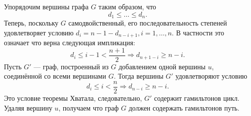 \documentclass[a4paper,12pt,twoside]{article}
\begin{document}
\begin{solution}{}
    Упорядочим вершины графа \(G\) таким образом, что
    \[
        d_{1} \leq \ldots \leq d_{n}.
    \]
    Теперь, поскольку \(G\) самодвойственный, его последовательность степеней удовлетворяет условию \(d_{i} = n - 1 - d_{n-i + 1}, i = 1, \ldots, n\). В частности это означает что верна следующая импликация:
    \[
        d_{i} \leq i - 1 < \frac{n + 1}{2} \Rightarrow d_{n + 1 - i} \geq n - i.
    \]
    Пусть \(G'\) --- граф, построенный из \(G\) добавлением одной вершины \(u\), соединённой со всеми вершинами \(G\). Тогда вершины \(G'\) удовлетворяют условию
    \[
        d_{i} \leq i < \frac{n}{2} \Rightarrow d_{n - i} \geq n - i.
    \]
    Это условие теоремы Хватала, следовательно, \(G'\) содержит гамильтонов цикл. Удаляя вершину \(u\), получаем что граф \(G\) должен содержать гамильтонов путь.
\end{solution}
\end{document}
